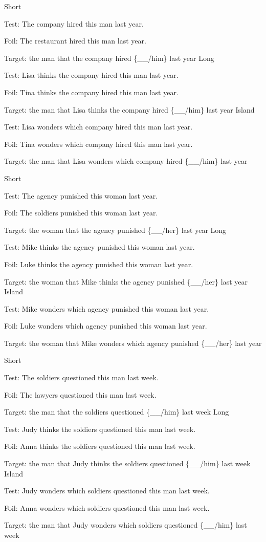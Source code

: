 \pex %
\a Short\par\nobreak
Test: The company hired this man last year.\par\nobreak
Foil: The restaurant hired this man last year.\par\nobreak
Target: the man that the company hired \{\_\_/him\} last year
\a Long\par\nobreak
Test: Lisa thinks the company hired this man last year.\par\nobreak
Foil: Tina thinks the company hired this man last year.\par\nobreak
Target: the man that Lisa thinks the company hired \{\_\_/him\} last year
\a Island\par\nobreak
Test: Lisa wonders which company hired this man last year.\par\nobreak
Foil: Tina wonders which company hired this man last year.\par\nobreak
Target: the man that Lisa wonders which company hired \{\_\_/him\} last year
\xe

\pex %
\a Short\par\nobreak
Test: The agency punished this woman last year.\par\nobreak
Foil: The soldiers punished this woman last year.\par\nobreak
Target: the woman that the agency punished \{\_\_/her\} last year
\a Long\par\nobreak
Test: Mike thinks the agency punished this woman last year.\par\nobreak
Foil: Luke thinks the agency punished this woman last year.\par\nobreak
Target: the woman that Mike thinks the agency punished \{\_\_/her\} last year
\a Island\par\nobreak
Test: Mike wonders which agency punished this woman last year.\par\nobreak
Foil: Luke wonders which agency punished this woman last year.\par\nobreak
Target: the woman that Mike wonders which agency punished \{\_\_/her\} last year
\xe

\pex %
\a Short\par\nobreak
Test: The soldiers questioned this man last week.\par\nobreak
Foil: The lawyers questioned this man last week.\par\nobreak
Target: the man that the soldiers questioned \{\_\_/him\} last week 
\a Long\par\nobreak
Test: Judy thinks the soldiers questioned this man last week.\par\nobreak
Foil: Anna thinks the soldiers questioned this man last week.\par\nobreak
Target: the man that Judy thinks the soldiers questioned \{\_\_/him\} last week
\a Island\par\nobreak
Test: Judy wonders which soldiers questioned this man last week.\par\nobreak
Foil: Anna wonders which soldiers questioned this man last week.\par\nobreak
Target: the man that Judy wonders which soldiers questioned \{\_\_/him\} last week
\xe

